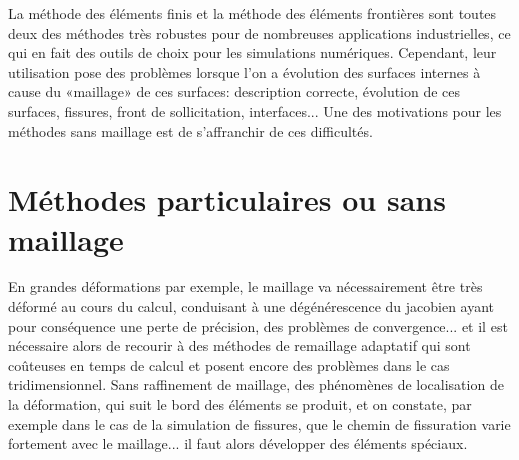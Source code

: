 \medskip
La méthode des éléments finis et la méthode des éléments frontières sont toutes deux des méthodes très robustes pour de nombreuses applications industrielles, ce qui en fait des outils de choix pour les simulations numériques. Cependant, leur utilisation pose des problèmes lorsque l'on a évolution des surfaces internes à cause du «maillage» de ces surfaces: description correcte, évolution de ces surfaces, fissures, front de sollicitation, interfaces... Une des motivations pour les méthodes sans maillage est de s'affranchir de ces difficultés.



\medskip
\section{Méthodes particulaires ou sans maillage}\label{Sec-meshless}

En grandes déformations par exemple, le maillage va nécessairement être très déformé au cours du calcul, conduisant à une dégénérescence du jacobien ayant pour conséquence une perte de précision, des problèmes de convergence... et il est nécessaire alors de recourir à des méthodes de remaillage adaptatif qui sont coûteuses en temps de calcul et posent encore des problèmes dans le cas tridimensionnel.
Sans raffinement de maillage, des phénomènes de localisation de la déformation, qui suit le bord des éléments se produit, et on constate, par exemple dans le cas de la simulation de fissures, que le chemin de fissuration varie fortement avec le maillage... il faut alors développer des éléments spéciaux.

